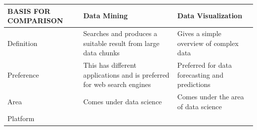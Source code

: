 \documentclass[]{book}
\theoremstyle{definition}
\theoremstyle{definition}
\theoremstyle{definition}
\theoremstyle{remark}
\begin{document}
\begin{longtable}[]{@{}lll@{}}
\toprule
\begin{minipage}[b]{0.08\columnwidth}\raggedright\strut
\textbf{BASIS FOR COMPARISON}\strut
\end{minipage} & \begin{minipage}[b]{0.41\columnwidth}\raggedright\strut
\textbf{Data Mining}\strut
\end{minipage} & \begin{minipage}[b]{0.41\columnwidth}\raggedright\strut
\textbf{Data Visualization}\strut
\end{minipage}\tabularnewline
\midrule
\endhead
\begin{minipage}[t]{0.08\columnwidth}\raggedright\strut
Definition\strut
\end{minipage} & \begin{minipage}[t]{0.41\columnwidth}\raggedright\strut
Searches and produces a suitable result from large data chunks\strut
\end{minipage} & \begin{minipage}[t]{0.41\columnwidth}\raggedright\strut
Gives a simple overview of complex data\strut
\end{minipage}\tabularnewline
\begin{minipage}[t]{0.08\columnwidth}\raggedright\strut
Preference\strut
\end{minipage} & \begin{minipage}[t]{0.41\columnwidth}\raggedright\strut
This has different applications and is preferred for web search
engines\strut
\end{minipage} & \begin{minipage}[t]{0.41\columnwidth}\raggedright\strut
Preferred for data forecasting and predictions\strut
\end{minipage}\tabularnewline
\begin{minipage}[t]{0.08\columnwidth}\raggedright\strut
Area\strut
\end{minipage} & \begin{minipage}[t]{0.41\columnwidth}\raggedright\strut
Comes under data science\strut
\end{minipage} & \begin{minipage}[t]{0.41\columnwidth}\raggedright\strut
Comes under the area of data science\strut
\end{minipage}\tabularnewline
\begin{minipage}[t]{0.08\columnwidth}\raggedright\strut
Platform\strut
\end{minipage} & \begin{minipage}[t]{0.41\columnwidth}\raggedright\strut

\end{minipage}
\end{longtable}
\end{document}
